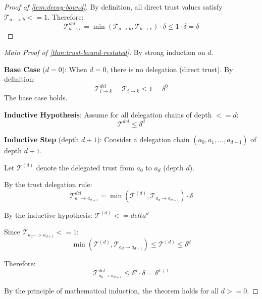 \documentclass[
]{article}
\begin{document}
\begin{proof}[Proof of \cref{lem:decay-bound}]
By definition, all direct trust values satisfy $\mathcal{T}_{a -> b} <= 1$. Therefore:
\begin{equation}
\label{eq:lem-decay-1}
\mathcal{T}_{a \to c}^{del} = \min(\mathcal{T}_{a \to b}, \mathcal{T}_{b \to c}) \cdot \delta \leq 1 \cdot \delta = \delta
\end{equation}
\end{proof}

\begin{proof}[Main Proof of \cref{thm:trust-bound-restated}]
By strong induction on $d$.

\textbf{Base Case} ($d = 0$): When $d = 0$, there is no delegation (direct trust). By definition:
\begin{equation}
\label{eq:base-case}
\mathcal{T}_{i \to k}^{del} = \mathcal{T}_{i \to k} \leq 1 = \delta^0
\end{equation}
The base case holds.

\textbf{Inductive Hypothesis}: Assume for all delegation chains of depth $<= d$:
\begin{equation}
\label{eq:ind-hyp}
\mathcal{T}^{del} \leq \delta^d
\end{equation}

\textbf{Inductive Step} (depth $d + 1$): Consider a delegation chain $(a_0, a_1, \ldots, a_{d+1})$ of depth $d + 1$.

Let $\mathcal{T}^{(d)}$ denote the delegated trust from $a_0$ to $a_d$ (depth $d$).

By the trust delegation rule:
\begin{equation}
\label{eq:ind-step-1}
\mathcal{T}_{a_0 \to a_{d+1}}^{del} = \min(\mathcal{T}^{(d)}, \mathcal{T}_{a_d \to a_{d+1}}) \cdot \delta
\end{equation}

By the inductive hypothesis: $\mathcal{T}^{(d)} <= delta^d$

Since $\mathcal{T}_{a_d -> a_{d+1}} <= 1$:
\begin{equation}
\label{eq:ind-step-2}
\min(\mathcal{T}^{(d)}, \mathcal{T}_{a_d \to a_{d+1}}) \leq \mathcal{T}^{(d)} \leq \delta^d
\end{equation}

Therefore:
\begin{equation}
\label{eq:ind-step-3}
\mathcal{T}_{a_0 \to a_{d+1}}^{del} \leq \delta^d \cdot \delta = \delta^{d+1}
\end{equation}

By the principle of mathematical induction, the theorem holds for all $d >= 0$.
\end{proof}
\end{document}
